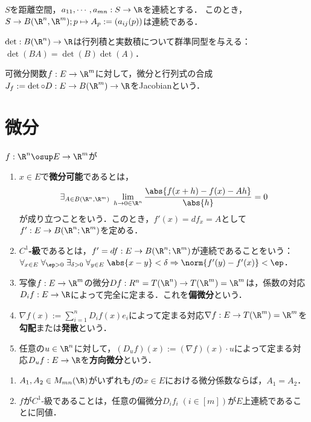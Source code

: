 \documentclass[uplatex, dvipdfmx]{jsreport}
\begin{document}
\begin{theorem}
    $S$を距離空間，$a_{11},\cdots,a_{mn}:S\to\R$を連続とする．
    このとき，$S\to B(\R^n,\R^m);p\mapsto A_p:=(a_{ij}(p))$は連続である．
\end{theorem}

\begin{theorem}[Jacobi行列からJacobianへの対応]
    $\det:B(\R^n)\to\R$は行列積と実数積について群準同型を与える：$\det(BA)=\det(B)\det(A)$．
\end{theorem}
\begin{definition}
    可微分関数$f:E\to\R^m$に対して，微分と行列式の合成
    $J_f:=\det\circ D:E\to B(\R^m)\to\R$をJacobianという．
\end{definition}

\section{微分}

\begin{definition}
    $f:\R^n\osup E\to\R^m$が
    \begin{enumerate}
        \item $x\in E$で\textbf{微分可能}であるとは，
        \[\exists_{A\in B(\R^n,\R^m)}\;\lim_{h\to0\in\R^n}\frac{\abs{f(x+h)-f(x)-Ah}}{\abs{h}}=0\]
        が成り立つことをいう．このとき，$f'(x)=df_x=A$として$f':E\to B(\R^n;\R^m)$を定める．
        \item \textbf{$C^1$-級}であるとは，$f'=df:E\to B(\R^n;\R^m)$が連続であることをいう：$\forall_{x\in E}\;\forall_{\ep>0}\;\exists_{\delta>0}\;\forall_{y\in E}\;\abs{x-y}<\delta\Rightarrow\norm{f'(y)-f'(x)}<\ep$．
        \item 写像$f:E\to\R^m$の微分$Df:R^n=T(\R^n)\to T(\R^m)=\R^m$は，係数の対応$D_if:E\to\R$によって完全に定まる．これを\textbf{偏微分}という．
        \item $\nabla f(x):=\sum_{i=1}^nD_if(x)e_i$によって定まる対応$\nabla f:E\to T(\R^m)=\R^m$を\textbf{勾配}または\textbf{発散}という．
        \item 任意の$u\in\R^n$に対して，$(D_uf)(x):=(\nabla f)(x)\cdot u$によって定まる対応$D_uf:E\to\R$を\textbf{方向微分}という．
    \end{enumerate}
\end{definition}

\begin{proposition}\mbox{}
    \begin{enumerate}
        \item $A_1,A_2\in M_{mn}(\R)$がいずれも$f$の$x\in E$における微分係数ならば，$A_1=A_2$．
        \item $f$が$C^1$-級であることは，任意の偏微分$D_if_i\;(i\in[m])$が$E$上連続であることに同値．
    \end{enumerate}
\end{proposition}
\end{document}
